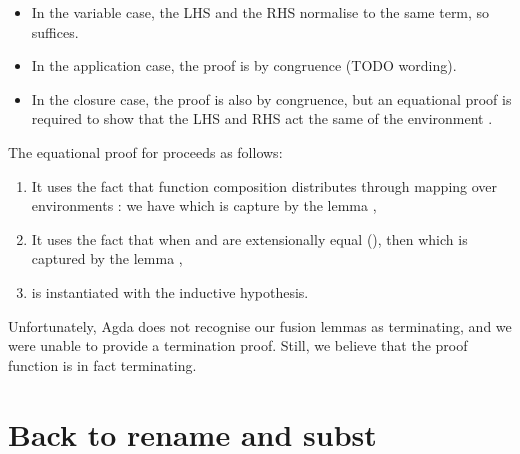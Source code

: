 \documentclass[bsc,frontabs,twoside,singlespacing,parskip,deptreport]{infthesis}
\theoremstyle{definition}
\begin{document}
\begin{itemize}
\item In the variable case, the LHS and the RHS normalise to the same
  term, so  suffices.
\item In the application case, the proof is by congruence (TODO
  wording).
\item In the closure case, the proof is also by congruence, but
  an equational proof is required to show that the LHS and RHS act the
  same of the environment .
\end{itemize}

The equational proof for  proceeds as follows:

\begin{enumerate}
\item It uses the fact that function composition 
  distributes through mapping over environments \AS{\_<\$>\_}: we have
   which is capture by the lemma
  ,
\item It uses the fact that when  and  are extensionally
  equal (), then  which
  is captured by the lemma ,
\item {} is instantiated with the inductive hypothesis.
\end{enumerate}

Unfortunately, Agda does not recognise our fusion lemmas as
terminating, and we were unable to provide a termination proof. Still,
we believe that the proof function is in fact terminating.

\section{Back to \ti rename and \ti subst}










\end{document}
